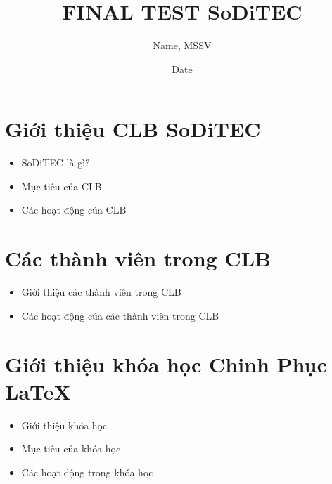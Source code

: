 \documentclass[a4paper, 12pt]{article}
\title{FINAL TEST SoDiTEC\\}
\author{Name, MSSV}
\date{Date}
\begin{document}
\maketitle
\section{Giới thiệu CLB SoDiTEC}
    \begin{itemize}
        \item SoDiTEC là gì?
        \item Mục tiêu của CLB
        \item Các hoạt động của CLB
    \end{itemize}
\section{Các thành viên trong CLB}
    \begin{itemize}
        \item Giới thiệu các thành viên trong CLB
        \item Các hoạt động của các thành viên trong CLB
    \end{itemize}
\section{Giới thiệu khóa học Chinh Phục LaTeX}
    \begin{itemize}
        \item Giới thiệu khóa học
        \item Mục tiêu của khóa học
        \item Các hoạt động trong khóa học
    \end{itemize}
\end{document}
